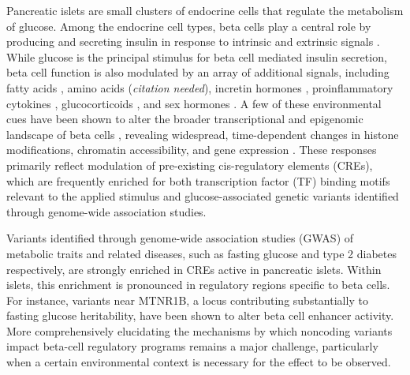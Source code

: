Pancreatic islets are small clusters of endocrine cells that regulate the metabolism of glucose. Among the endocrine cell types, beta cells play a central role by producing and secreting insulin in response to intrinsic and extrinsic signals \cite{Prentki2013-vx}. While glucose is the principal stimulus for beta cell mediated insulin secretion, beta cell function is also modulated by an array of additional signals, including fatty acids \cite{Fu2013-cf,Mauvais-Jarvis2016-gm,Ramos-Rodriguez2019-ha,Aylward2021-nw}, amino acids (\textit{citation needed}), incretin hormones \cite{Saxena2010-ui}, proinflammatory cytokines \cite{Benaglio2022-rq}, glucocorticoids \cite{Aylward2021-nw,Reddy2009-qu}, and sex hormones \cite{Mauvais-Jarvis2016-gm}. A few of these environmental cues have been shown to alter the broader transcriptional and epigenomic landscape of beta cells \cite{Aylward2021-nw,Benaglio2022-rq,Ramos-Rodriguez2019-ha}, revealing widespread, time-dependent changes in histone modifications, chromatin accessibility, and gene expression \cite{Ramos-Rodriguez2019-ha,Benaglio2022-rq}. These responses primarily reflect modulation of pre-existing cis-regulatory elements (CREs), which are frequently enriched for both transcription factor (TF) binding motifs relevant to the applied stimulus and glucose-associated genetic variants identified through genome-wide association studies.


Variants identified through genome-wide association studies (GWAS) of metabolic traits and related diseases, such as fasting glucose and type 2 diabetes respectively, are strongly enriched in CREs active in pancreatic islets. Within islets, this enrichment is pronounced in regulatory regions specific to beta cells. For instance, variants near MTNR1B, a locus contributing substantially to fasting glucose heritability, have been shown to alter beta cell enhancer activity. More comprehensively elucidating the mechanisms by which noncoding variants impact beta-cell regulatory programs remains a major challenge, particularly when a certain environmental context is necessary for the effect to be observed.

